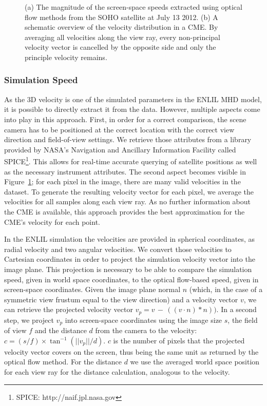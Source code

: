 \documentclass[journal]{vgtc}                %
\begin{document}
\begin{figure}
{  \label{fig:simulationvelocitygathering}
}
\caption{(a) The magnitude of the screen-space speeds extracted using optical flow methods from the SOHO satellite at July 13 2012. (b) A schematic overview of the velocity distribution in a CME. By averaging all velocities along the view ray, every non-principal velocity vector is cancelled by the opposite side and only the principle velocity remains.}
\end{figure}

\subsubsection{Simulation Speed} \label{sec:simulationvelocity}
As the 3D velocity is one of the simulated parameters in the ENLIL MHD model, it is possible to directly extract it from the data. However, multiple aspects come into play in this approach. First, in order for a correct comparison, the scene camera has to be positioned at the correct location with the correct view direction and field-of-view settings. We retrieve those attributes from a library provided by NASA's Navigation and Ancillary Information Facility called SPICE\footnote{SPICE: http://naif.jpl.nasa.gov}. This allows for real-time accurate querying of satellite positions as well as the necessary instrument attributes. The second aspect becomes visible in Figure~\ref{fig:simulationvelocitygathering}; for each pixel in the image, there are many valid velocities in the dataset. To generate the resulting velocity vector for each pixel, we average the velocities for all samples along each view ray. As no further information about the CME is available, this approach provides the best approximation for the CME's velocity for each point.

In the ENLIL simulation the velocities are provided in spherical coordinates, as radial velocity and two angular velocities. We convert those velocities to Cartesian coordinates in order to project the simulation velocity vector into the image plane. This projection is necessary to be able to compare the simulation speed, given in world space coordinates, to the optical flow-based speed, given in screen-space coordinates. Given the image plane normal $n$ (which, in the case of a symmetric view frustum equal to the view direction) and a velocity vector $v$, we can retrieve the projected velocity vector $v_p = v\,-\,\left(\left(v \cdot n \right) * n \right))$. In a second step, we project $v_p$ into screen-space coordinates using the image size $s$, the field of view $f$ and the distance $d$ from the camera to the velocity: $ c = \left(s / f \right) \times \tan^{-1}\left( ||v_p|| / d \right)$. $c$ is the number of pixels that the projected velocity vector covers on the screen, thus being the same unit as returned by the optical flow method. For the distance $d$ we use the averaged world space position for each view ray for the distance calculation, analogous to the velocity. 
\end{document}
